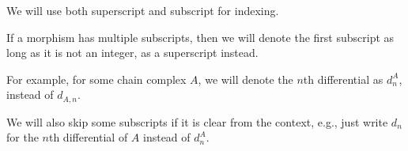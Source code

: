 We will use both superscript and subscript for indexing.
\begin{notation}
    If a morphism has multiple subscripts, then we will denote the first subscript as long as it is not an integer, as a superscript instead.

    For example, for some chain complex \( A \), we will denote the \( n \)th differential as \( d_n^A \), instead of \( d_{A, n} \).

    We will also skip some subscripts if it is clear from the context, e.g., just write \( d_n \) for the \( n \)th differential of \( A \) instead of \( d_n^A \).
\end{notation}